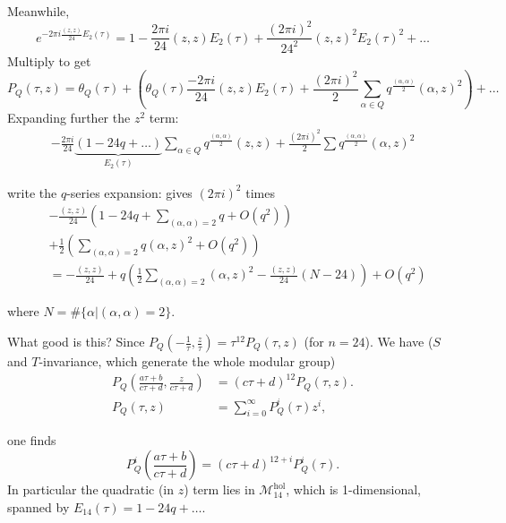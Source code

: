\noindent
Meanwhile,
$$
e^{-2\pi i \frac{(z,z)}{24}E_2(\tau)}
=1-\frac{2\pi i}{24}(z,z)E_2(\tau)
+\frac{(2\pi
i)^2}{24^2}(z,z)^2E_2(\tau)^2+\ldots
$$
Multiply to get
$$
P_Q(\tau,z)=\theta_Q(\tau)+
\left(\theta_Q(\tau)\frac{-2\pi
i}{24}(z,z)E_2(\tau)
+\frac{(2\pi i)^2}{2}
\sum_{\alpha \in
Q}q^{\frac{(\alpha,\alpha)}{2}}(\alpha,z)
^2\right)+\ldots
$$
Expanding further the $z^2$ term:
$$
\begin{aligned}
-\frac{2\pi i}{24}\underbrace{(1-24q+\ldots)
}_{E_2(\tau)}
\sum_{\alpha \in
Q}q^{\frac{(\alpha,\alpha)}{2}}(z,z)
+\frac{(2\pi i)^2}{2}\sum
q^{\frac{(\alpha,\alpha)}{2}}(\alpha,z)^2
\end{aligned}
$$

\noindent
write the $q$-series expansion:
gives $(2\pi i)^2$ times
\begin{equation}
\label{equation-e14}\begin{aligned}
&-\frac{(z,z)}{24}\left(1-24q
+\sum_{(\alpha,\alpha)=2}q+O(q^2)\right)\\
&+\frac{1}{2}\left(
\sum_{(\alpha,\alpha)=2}q(\alpha,z)^2+O(q^2)
\right)\\
&=-\frac{(z,z)}{24}
+q\left(\frac{1}{2}\sum_{(\alpha,\alpha)=2}
(\alpha,z)^2
-\frac{(z,z)}{24}(N-24)\right)
+O(q^2)
\end{aligned}
\end{equation}

\noindent
where $N=\#\{\alpha|(\alpha,\alpha)=2\}$.

\medskip\noindent
What good is this?
Since
$P_Q\left(-\frac{1}{\tau},\frac{z}{\tau}
\right)
=\tau^{12}P_Q(\tau,z)$ (for $n=24$).
We have ($S$ and $T$-invariance, which
generate
the whole modular group)
$$
\begin{aligned}
P_Q\left(\frac{a\tau+b}{c\tau+d},\frac{z}
{c\tau+d}\right)
&=(c\tau+d)^{12}P_Q(\tau,z).\\
P_Q(\tau,z)&=
\sum_{i=0}^\infty P_Q^i(\tau)z^i,
\end{aligned}
$$

\noindent
one finds
$$
P_Q^i\left(\frac{a\tau+b}{c\tau+d}\right)
=(c\tau+d)^{12+i}P_Q^i(\tau).
$$
In particular the quadratic (in $z$)
term lies in $\mathcal{M}^{\text{hol}}_{14}$,
which is 1-dimensional, spanned by
$E_{14}(\tau)=1-24q+\ldots$.


